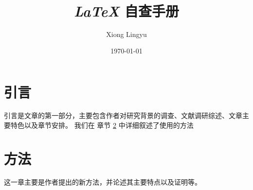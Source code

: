 \documentclass[a4paper, 12pt]{article} %
\title{\emph{\LaTeX} 自查手册} %
\author{Xiong Lingyu} %
\date{\today} %
\numberwithin{equation}{section} %
\numberwithin{figure}{section} %
\begin{document}
    \maketitle

    \newpage %
    {\centering\tableofcontents}
    \setcounter{tocdepth}{1}
    \newpage
    
    \section{引言} \label{sec:intro} 
    引言是文章的第一部分，主要包含作者对研究背景的调查、文献调研综述、文章主要特色以及章节安排。
    我们在 章节 \ref{sec:method} 中详细叙述了使用的方法  
    \section{方法} \label{sec:method} 
    这一章主要是作者提出的新方法，并论述其主要特点以及证明等。
\end{document}
